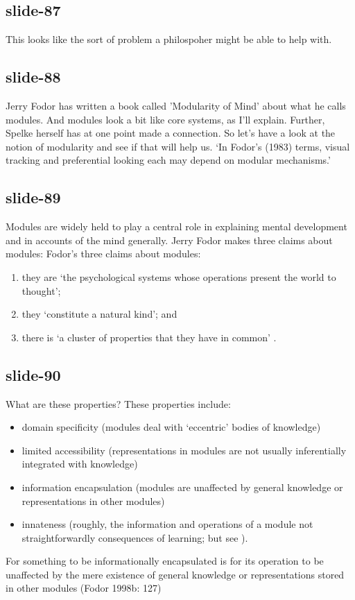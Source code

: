 \documentclass[12pt,\papersize]{extarticle}
\begin{document}
 
\subsection{slide-87}
This looks like the sort of problem a philospoher might be able to help with.
 
 
\subsection{slide-88}
Jerry Fodor has written a book called 'Modularity of Mind' about what he calls modules.
And modules look a bit like core systems, as I'll explain.
Further, Spelke herself has at one point made a connection.
So let's have a look at the notion of modularity and see if that will help us.
‘In Fodor’s (1983) terms, visual tracking and preferential looking each may depend on modular mechanisms.’
\citep[p.\ 137]{spelke:1995_spatiotemporal}
 
 
\subsection{slide-89}
Modules are widely held to play a central role in explaining mental development and in accounts of the mind generally.
Jerry Fodor makes three claims about modules:
Fodor’s three claims about modules:
\begin{enumerate}
\item they are ‘the psychological systems whose operations present the world to thought’;
\item they ‘constitute a natural kind’; and
\item there is ‘a cluster of properties that they have in common’ \citep[p.\ 101]{Fodor:1983dg}.
\end{enumerate}
 
 
\subsection{slide-90}
What are these properties?
These properties include:
\begin{itemize}
\item domain specificity (modules deal with ‘eccentric’ bodies of knowledge)
\item limited accessibility (representations in modules are not usually inferentially integrated with knowledge)
\item information encapsulation (modules are unaffected by general knowledge or representations in other modules)
\item innateness (roughly, the information and operations of a module not straightforwardly consequences of learning; but see \citet{Samuels:2004ho}).
\end{itemize}
For something to be informationally encapsulated is for its operation to be unaffected by the mere existence of general knowledge or representations stored in other modules (Fodor 1998b: 127)
 
\end{document}
